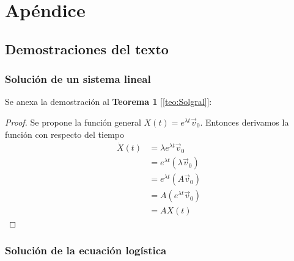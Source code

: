 \chapter{Apéndice}\label{ch:Ap}

\section{Demostraciones del texto}
\subsection{Solución de un sistema lineal}
Se anexa la demostración al \textbf{Teorema 1} [\ref{teo:Solgral}]:
\begin{proof}
	Se propone la función general $X(t)=e^{\lambda t}\vec{v}_0$. Entonces derivamos la función con respecto del tiempo
	\begin{align*}
		\dot{X}(t) &= \lambda e^{\lambda t}\vec{v}_0\\
				   &= e^{\lambda t}(\lambda\vec{v}_0)\\
				   &= e^{\lambda t}(A\vec{v}_0)		\\
				   &= A(e^{\lambda t}\vec{v}_0)\\
				   &= AX(t)
	\end{align*}
\end{proof}

\subsection{Solución de la ecuación logística}\label{sec:SolEqLogistica}

